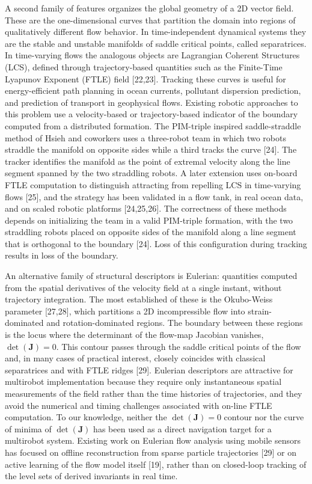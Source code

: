 \documentclass[lettersize,journal]{IEEEtran}
\begin{document}
A second family of features organizes the global geometry of a 2D vector field. These are the one-dimensional curves that partition the domain into regions of qualitatively different flow behavior. In time-independent dynamical systems they are the stable and unstable manifolds of saddle critical points, called separatrices. In time-varying flows the analogous objects are Lagrangian Coherent Structures (LCS), defined through trajectory-based quantities such as the Finite-Time Lyapunov Exponent (FTLE) field [22,23]. Tracking these curves is useful for energy-efficient path planning in ocean currents, pollutant dispersion prediction, and prediction of transport in geophysical flows. Existing robotic approaches to this problem use a velocity-based or trajectory-based indicator of the boundary computed from a distributed formation. The PIM-triple inspired saddle-straddle method of Hsieh and coworkers uses a three-robot team in which two robots straddle the manifold on opposite sides while a third tracks the curve [24]. The tracker identifies the manifold as the point of extremal velocity along the line segment spanned by the two straddling robots. A later extension uses on-board FTLE computation to distinguish attracting from repelling LCS in time-varying flows [25], and the strategy has been validated in a flow tank, in real ocean data, and on scaled robotic platforms [24,25,26]. The correctness of these methods depends on initializing the team in a valid PIM-triple formation, with the two straddling robots placed on opposite sides of the manifold along a line segment that is orthogonal to the boundary [24]. Loss of this configuration during tracking results in loss of the boundary.

An alternative family of structural descriptors is Eulerian: quantities computed from the spatial derivatives of the velocity field at a single instant, without trajectory integration. The most established of these is the Okubo-Weiss parameter [27,28], which partitions a 2D incompressible flow into strain-dominated and rotation-dominated regions. The boundary between these regions is the locus where the determinant of the flow-map Jacobian vanishes, $\det(\mathbf{J}) = 0$. This contour passes through the saddle critical points of the flow and, in many cases of practical interest, closely coincides with classical separatrices and with FTLE ridges [29]. Eulerian descriptors are attractive for multirobot implementation because they require only instantaneous spatial measurements of the field rather than the time histories of trajectories, and they avoid the numerical and timing challenges associated with on-line FTLE computation. To our knowledge, neither the $\det(\mathbf{J}) = 0$ contour nor the curve of minima of $\det(\mathbf{J})$ has been used as a direct navigation target for a multirobot system. Existing work on Eulerian flow analysis using mobile sensors has focused on offline reconstruction from sparse particle trajectories [29] or on active learning of the flow model itself [19], rather than on closed-loop tracking of the level sets of derived invariants in real time.
\end{document}
